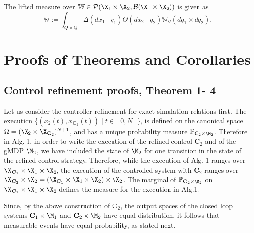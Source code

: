\documentclass[letterpaper, 10 pt, conference]{amsart}
\theoremstyle{definition}
\theoremstyle{example}
\theoremstyle{remark}
\newcommand{\C}{{\mathbf{C}}}
\begin{document}
\noindent The lifted measure over $\mathbb W\in\mathcal P(\X_1\times\X_2,\mathcal B(\X_1\times\X_2))$
is given as 
\[\mathbb W:= \int_{Q\times Q} \Delta(dx_1\mid q_1) \Theta(dx_2\mid q_2)  \mathbb W_{\mathcal Q} (dq_1\times d q_2).\]
 \endproof

 
 
 \section{Proofs of Theorems and Corollaries}\label{app:proofs} 
 
 \subsection{Control refinement proofs, Theorem 1- 4}
 Let us consider the controller refinement for exact simulation relations first.
 The execution $\{( x_2(t), x_{\C_2}(t)){\mid} t\in [0,N]\}$, 
is defined on the canonical space $\Omega=(\X_2\times \X_{\C_2})^{N+1}$, 
and has a unique probability measure $\mathbb P_{\C_2\times \M_2}$. 
Therefore in Alg. 1, 
in order to write the execution of the refined control $\C_2$ and of the gMDP $\M_2$, 
we have included the state of $\M_2$ for one transition in the state of the refined control strategy. 
Therefore, while the execution of Alg. 1 ranges over $\X_{\C_1}\times\X_1\times \X_2$, 
the execution of the controlled system with $\C_2$ ranges over $\X_{\C_2}\times \X_{2}=(\X_{\C_1}\times\X_1\times \X_2)\times\X_2$. The marginal of $\mathbb P_{\C_2\times \M_2}$ on $\X_{\C_1}\times\X_1\times \X_2$ defines the measure for the execution in Alg.1.

Since, by the above construction of $\C_2$, 
the output spaces of the closed loop systems $\C_1\times\M_1$ and $\C_2\times \M_2$ have equal distribution, 
it follows that measurable events have equal probability, as stated next. 
\end{document}
